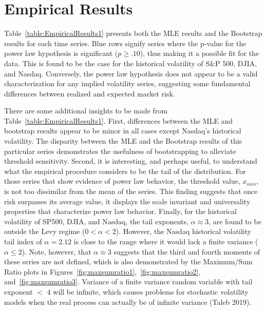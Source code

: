 \documentclass[11pt,a4paper,oldfontcommands]{memoir}
\begin{document}
{\section{Empirical Results}


Table~\ref{table:EmpiricalResults1} presents both the MLE results and the Bootstrap results for each time series. Blue rows signify series where the p-value for the power law hypothesis is significant ($p \ge .10$), thus making it a possible fit for the data. This is found to be the case for the historical volatility of S\&P 500, DJIA, and Nasdaq. Conversely, the power law hypothesis does not appear to be a valid characterization for any implied volatility series, suggesting some fundamental differences between realized and expected market risk. 

There are some additional insights to be made from Table~\ref{table:EmpiricalResults1}. First, differences between the MLE and bootstrap results appear to be minor in all cases except Nasdaq's historical volatility. The disparity between the MLE and the Bootstrap results of this particular series demonstrates the usefulness of bootstrapping to alleviate threshold sensitivity. Second, it is interesting, and perhaps useful, to understand what the empirical procedure considers to be the tail of the distribution. For those series that show evidence of power law behavior, the threshold value, $x_{min}$, is not too dissimilar from the mean of the series. This finding suggests that once risk surpasses its average value, it displays the scale invariant and universality properties that characterize power law behavior. Finally, for the historical volatility of SP500, DJIA, and Nasdaq, the tail exponents, $\alpha \approx 3$, are found to be outside the Levy regime ($0 < \alpha < 2$). However, the Nasdaq historical volatility tail index of $\alpha = 2.12$ is close to the range where it would lack a finite variance ($\alpha \leq 2$). Note, however, that $\alpha \approx 3$ suggests that the third and fourth moments of these series are not defined, which is also demonstrated by the Maximum/Sum Ratio plots in Figures~\ref{fig:maxsumratio1},~\ref{fig:maxsumratio2}, and~\ref{fig:maxsumratio3}. Variance of a finite variance random variable with tail exponent $<$ 4 will be infinite, which causes problems for stochastic volatility models when the real process can actually be of infinite variance (Taleb 2019).


}
\end{document}
